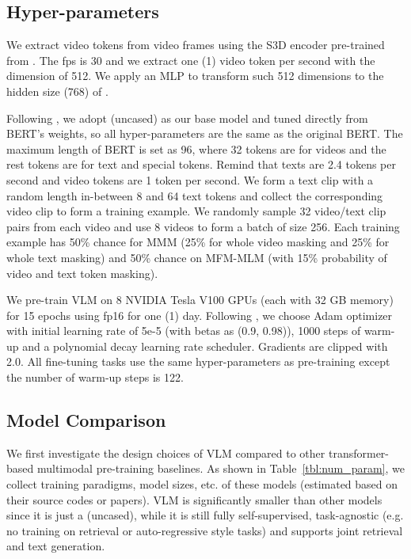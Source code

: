 \documentclass[11pt,a4paper]{article}
\begin{document}
\subsection{Hyper-parameters}
We extract video tokens from video frames using the S3D encoder pre-trained from \cite{miech2020end}. 
The fps is 30 and we extract one (1) video token per second with the dimension of 512. We apply an MLP to transform such 512 dimensions to the hidden size (768) of .

Following \cite{luo2020univilm}, we adopt  (uncased) as our base model and tuned directly from BERT's weights, so all hyper-parameters are the same as the original BERT. The maximum length of BERT is set as 96, where 32 tokens are for videos and the rest tokens are for text and special tokens.
Remind that texts are 2.4 tokens per second and video tokens are 1 token per second.
We form a text clip with a random length in-between 8 and 64 text tokens and collect the corresponding video clip to form a training example.
We randomly sample 32 video/text clip pairs from each video and use 8 videos to form a batch of size 256.
Each training example has 50\% chance for MMM (25\% for whole video masking and 25\% for whole text masking) and 50\% chance on MFM-MLM (with 15\% probability of video and text token masking).

We pre-train VLM on 8 NVIDIA Tesla V100 GPUs (each with 32 GB memory) for 15 epochs using fp16 for one (1) day.
Following \cite{liu2019roberta}, we choose Adam \cite{kingma2014adam} optimizer with initial learning rate of 5e-5 (with betas as (0.9, 0.98)), 1000 steps of warm-up and a polynomial decay learning rate scheduler. Gradients are clipped with 2.0. All fine-tuning tasks use the same hyper-parameters as pre-training except the number of warm-up steps is 122.

\subsection{Model Comparison}
We first investigate the design choices of VLM compared to other transformer-based multimodal pre-training baselines.
As shown in Table~\ref{tbl:num_param}, we collect training paradigms, model sizes, etc. of these models (estimated based on their source codes or papers).
VLM is significantly smaller than other models since it is just a  (uncased), while it is still fully self-supervised, task-agnostic (e.g. no training on retrieval or auto-regressive style tasks) and supports joint retrieval and text generation.
\end{document}
